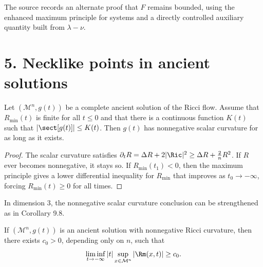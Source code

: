 \begin{remark}
\label{ch09-rem-alternate-boundedness-of-F}

The source records an alternate proof that \(F\) remains bounded, using the enhanced maximum principle for systems and a directly controlled auxiliary quantity built from \(\lambda-\nu\).
\end{remark}

\section*{5. Necklike points in ancient solutions}

\begin{lemma}
\label{ch09-lem-ancient-nonnegative-scalar}

Let \((\mathcal M^n,g(t))\) be a complete ancient solution of the Ricci flow. Assume that \(R_{\min}(t)\) is finite for all \(t\le 0\) and that there is a continuous function \(K(t)\) such that \(|\sect[g(t)]|\le K(t)\). Then \(g(t)\) has nonnegative scalar curvature for as long as it exists.
\end{lemma}

\begin{proof}
\sketch The scalar curvature satisfies \(\partial_t R=\Delta R+2|\Ric|^2\ge \Delta R+\frac{2}{n}R^2\). If \(R\) ever becomes nonnegative, it stays so. If \(R_{\min}(t_1)<0\), then the maximum principle gives a lower differential inequality for \(R_{\min}\) that improves as \(t_0\to-\infty\), forcing \(R_{\min}(t)\ge 0\) for all times.
\end{proof}

\begin{remark}
\label{ch09-rem-ancient-scalar-three-dimensional}

In dimension \(3\), the nonnegative scalar curvature conclusion can be strengthened as in Corollary 9.8.
\end{remark}

\begin{lemma}
\label{ch09-lem-ancient-lower-blowup-rate}

If \((\mathcal M^n,g(t))\) is an ancient solution with nonnegative Ricci curvature, then there exists \(c_0>0\), depending only on \(n\), such that
\[
\liminf_{t\to -\infty}|t|\sup_{x\in\mathcal M^n}|\Rm(x,t)|\ge c_0.
\]
\end{lemma}

